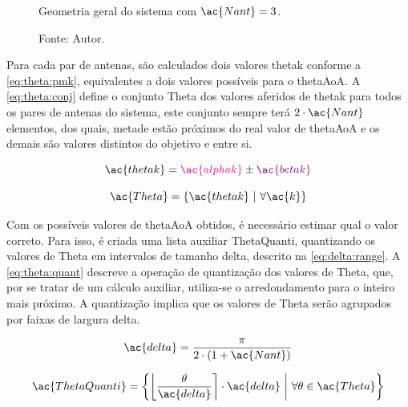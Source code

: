 \begin{figure}[htbp]
    \centering
    \caption{Geometria geral do sistema com $\ac{Nant} = 3$.}
    
    \label{fig:AoA:geometria}
    \caption*{Fonte: Autor.}
\end{figure}

Para cada par de antenas, são calculados dois valores \ac{thetak} conforme a \autoref{eq:theta:pmk}, equivalentes a dois valores possíveis para o \ac{thetaAoA}.
A \autoref{eq:theta:conj} define o conjunto \ac{Theta} dos valores aferidos de \ac{thetak} para todos os pares de antenas do sistema, este conjunto sempre terá $2 \cdot \ac{Nant}$ elementos, dos quais, metade estão próximos do real valor de \ac{thetaAoA} e os demais são valores distintos do objetivo e entre si.

\begin{equation} \label{eq:theta:pmk}
	\ac{thetak} = \textcolor{cmyk_M}{\ac{alphak}}\pm \textcolor{Purple}{\ac{betak}}
\end{equation}

\begin{equation} \label{eq:theta:conj}
	\ac{Theta} = \left\{\ac{thetak} ~\middle\vert~ \forall \ac{k}\right\}
\end{equation}


Com os possíveis valores de \ac{thetaAoA} obtidos, é necessário estimar qual o valor correto.
Para isso, é criada uma lista auxiliar \ac{ThetaQuanti}, quantizando os valores de \ac{Theta} em intervalos de tamanho \ac{delta}, descrito na \autoref{eq:delta:range}.
A \autoref{eq:theta:quant} descreve a operação de quantização dos valores de \ac{Theta}, que, por se tratar de um cálculo auxiliar, utiliza-se o arredondamento para o inteiro mais próximo.
A quantização implica que os valores de \ac{Theta} serão agrupados por faixas de largura \ac{delta}.

\begin{equation} \label{eq:delta:range}
    \ac{delta} = \frac{\pi}{2 \cdot \left( 1 + \ac{Nant} \right)}
\end{equation}

\begin{equation} \label{eq:theta:quant}
    \ac{ThetaQuanti} =
    \left\{\left\lfloor\frac{\theta}{\ac{delta}}\right\rceil\cdot\ac{delta} ~\middle\vert~ \forall \theta \in \ac{Theta}  \right\}
\end{equation}

